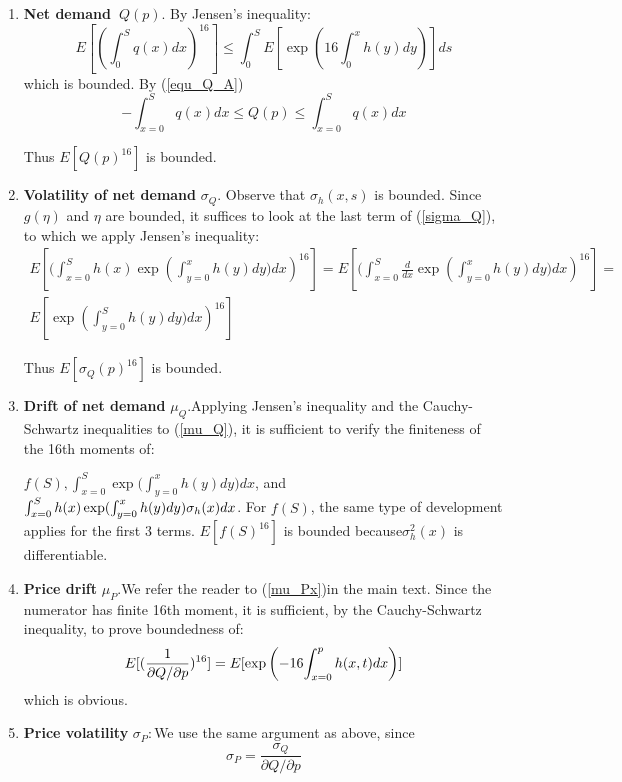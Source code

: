 \documentclass{article}
\begin{document}
\begin{enumerate}
\item \textbf{Net demand\ }$Q(p).$ By Jensen's inequality:%
\begin{equation*}
E[(\int_{0}^{S}q(x)dx)^{16}]\leq \int_{0}^{S}E[\exp (16\int_{0}^{x}h(y)dy)]ds
\end{equation*}%
which is bounded. By (\ref{equ_Q_A}) 
\begin{equation*}
-\int_{x=0}^{S}q(x)dx\leq Q(p)\leq \int_{x=0}^{S}q(x)dx
\end{equation*}

Thus $E[Q(p)^{16}]$ is bounded.

\item \textbf{Volatility of net demand }$\sigma _{Q}$.  Observe that $\sigma
_{h}(x,s)$ is bounded. Since $g(\eta )$ and $\eta $ are bounded, it suffices
to look at the last term of (\ref{sigma_Q}), to which we apply Jensen's
inequality:%
\begin{gather*}
E[(\int_{x=0}^{S}{h(x)}\exp ({\int_{y=0}^{x}h(y)dy)}dx)^{16}]=E[(%
\int_{x=0}^{S}\frac{d}{dx}\exp ({\int_{y=0}^{x}h(y)dy)}dx)^{16}]= \\
E[\exp ({\int_{y=0}^{S}h(y)dy)}dx)^{16}]
\end{gather*}

Thus $E[\sigma _{Q}(p)^{16}]$ is bounded.

\item \textbf{Drift of net demand }$\mu _{Q}.$Applying Jensen's inequality
and the Cauchy-Schwartz inequalities to (\ref{mu_Q}), it is sufficient to
verify the finiteness of the 16th moments of:

$f(S),\int_{x=0}^{S}\exp ({\int_{y=0}^{x}h(y)dy)dx}$, and $\int_{x=0}^{S}{%
h(x)}\exp ({\int_{y=0}^{x}h(y)dy)\sigma _{h}(x)dx}$. For $f(S)$, the same
type of development applies for the first 3 terms. $E[f(S)^{16}]$ is bounded
because$\sigma _{h}^{2}(x)$ is differentiable.

\item \textbf{Price drift }$\mu _{P}.$We refer the reader to (\ref{mu_Px})in
the main text. Since the numerator has finite 16th moment, it is sufficient,
by the Cauchy-Schwartz inequality, to prove boundedness of:%
\begin{equation*}
E[(\frac{1}{\partial Q/\partial p})^{16}]=E[\exp \left( -16{%
\int_{x=0}^{p}h(x,t)dx}\right) ]
\end{equation*}%
\qquad which is obvious.

\item \textbf{Price volatility }$\sigma _{P}:$We use the same argument as
above, since%
\begin{equation*}
\sigma _{P}=\frac{\sigma _{Q}}{\partial Q/\partial p}
\end{equation*}


\end{enumerate}
\end{document}
